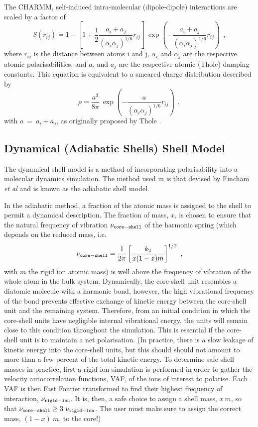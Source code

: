 The CHARMM, self-induced intra-molecular (dipole-dipole) interactions
are scaled by a factor of
\begin{equation}
S(r_{ij}) = 1 -\left[ 1 + \frac{1}{2}
\frac{a_{i}+a_{j}}{(\alpha_{i}\alpha_{j})^{1/6}} r_{ij}\right]~
\exp\left(-\frac{a_{i}+a_{j}}{(\alpha_{i}\alpha_{j})^{1/6}} r_{ij}\right)~~,
\end{equation}
where $r_{ij}$ is the distance between atoms i and j, $\alpha_{i}$ and
$\alpha_{j}$ are the respective atomic polarisabilities, and $a_{i}$
and $a_{j}$ are the respective atomic (Thole) damping constants.  This
equation is equivalent to a smeared charge distribution described by
\begin{equation}
\rho = \frac{a^{3}}{8\pi}~\exp\left(-\frac{a}{(\alpha_{i}\alpha_{j})^{1/6}} r_{ij}\right)~~,
\end{equation}
with $a~=~a_{i}+a_{j}$, as originally proposed by Thole \cite{thole-81a}.

\subsection{Dynamical (Adiabatic Shells) Shell Model}

The dynamical shell model is a method of incorporating
polarisability into a molecular dynamics simulation.
The method used in \D is that devised by Fincham {\em et al}
\cite{fincham-93a} and is known as the adiabatic shell model.

In the adiabatic method, a fraction of the atomic mass is assigned
to the shell to permit a dynamical description.  The fraction of
mass, $x$, is chosen to ensure that the natural frequency of
vibration $\nu_{\tt core-shell}$ of the harmonic spring (which
depends on the reduced mass, i.e.
\begin{equation}
\nu_{\tt core-shell} = \frac{1}{2\pi} \left[ \frac{k_{2}}{x(1-x)m} \right]^{1/2}~,
\end{equation}
with $m$ the rigid ion atomic mass) is well above the frequency of
vibration of the whole atom in the bulk system.  Dynamically,
the core-shell unit resembles a diatomic molecule with a harmonic
bond, however, the high vibrational
frequency of the bond prevents effective exchange of kinetic
energy between the core-shell unit and the remaining system.
Therefore, from an initial condition in which the core-shell units
have negligible internal vibrational energy, the units will remain
close to this condition throughout the simulation.  This is
essential if the core-shell unit is to maintain a net
polarisation.  (In practice, there is a slow
leakage of kinetic energy into the core-shell units, but this
should should not amount to more than a few percent of the total
kinetic energy.  To determine safe shell masses in practice,
first a rigid ion simulation is performed in order to gather the
velocity autocorrelation functions, VAF, of the ions of interest
to polarise.  Each VAF is then Fast Fourier transformed to find
their highest frequency of interaction, $\nu_{\tt rigid-ion}$.  It
is, then, a safe choice to assign a shell mass, $x~m$, so that
$\nu_{\tt core-shell} \geq 3~\nu_{\tt rigid-ion}$.  The user must
make sure to assign the correct mass, $(1-x)~m$, to the core!)


